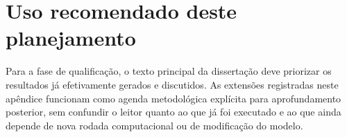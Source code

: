 \section{Uso recomendado deste planejamento}

Para a fase de qualificação, o texto principal da dissertação deve priorizar os resultados já efetivamente gerados e discutidos. As extensões registradas neste apêndice funcionam como agenda metodológica explícita para aprofundamento posterior, sem confundir o leitor quanto ao que já foi executado e ao que ainda depende de nova rodada computacional ou de modificação do modelo.
